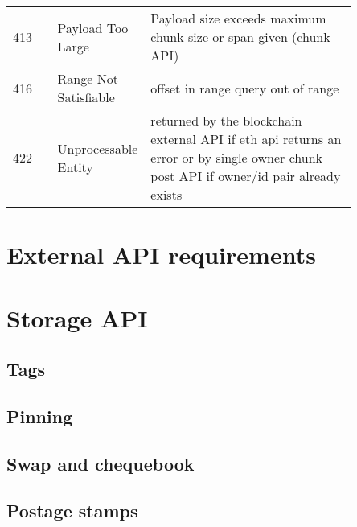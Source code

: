 \begin{definition}
\begin{tabular}{l|p{0.25\linewidth}|p{0.6\linewidth}}
413 & Payload Too Large  &
Payload size exceeds maximum chunk size or span given (chunk API)
\\
416 & Range Not Satisfiable  & offset in range query out of range
\\
422 & Unprocessable Entity & returned by the blockchain external API if eth api returns an error or by single owner chunk post API if owner/id pair already exists
\end{tabular}
\end{definition}


\section{External API requirements\statusorange}\label{spec:api:external}



\section{Storage API \statusyellow}\label{spec:api:storage}


\subsection{Tags \statusyellow}\label{spec:api:tags}


\subsection{Pinning
\statusyellow}\label{spec:api:pinning}


\subsection{Swap and chequebook\statusorange}\label{spec:api:swap}


\subsection{Postage stamps \statusorange}\label{spec:api:postage}



